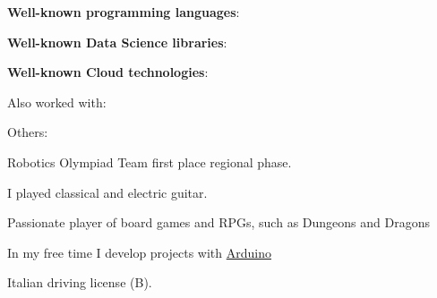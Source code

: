 
\textbf{Well-known programming languages}:
\begin{center}
\end{center}
\divider{}

\textbf{Well-known Data Science libraries}:
\begin{center}
\end{center}
\divider{}

\textbf{Well-known Cloud technologies}:
\begin{center}
\end{center}
\divider{}

Also worked with:
\begin{center}
\end{center}
\begin{center}
\end{center}
\divider{}

Others:
\begin{center}
\end{center}


\cvachievement{\faTrophy}
{Robotics Olympiad \smallskip}
{\small{}%
  \small{}}
Team first place regional phase.

\medskip


%
{\small {}%
  \small{}}\par%
I played classical and electric guitar.%
\divider{}

%
{Passionate player of board games and RPGs, such as Dungeons and Dragons}
\divider{}

%
{In my free time I develop projects with \href{https://www.arduino.cc/}{Arduino}}
\divider{}

%
{\small {}%
  \small{}}\par%
Italian driving license (B).
